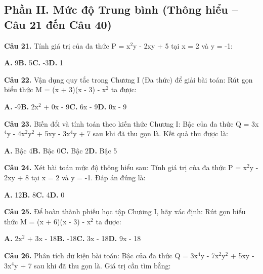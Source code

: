 \documentclass[11pt,a4paper]{article}
\begin{document}
\subsection*{\color{accent} Phần II. Mức độ Trung bình (Thông hiểu -- Câu 21 đến Câu 40)}
\textbf{\color{primary} Câu 21.} Tính giá trị của đa thức P = x$^2$y - 2xy + 5 tại x = 2 và y = -1:\par
\hspace*{1.5em}\textbf{A.} 9\quad\quad \textbf{B.} 5\quad\quad \textbf{C.} -3\quad\quad \textbf{D.} 1\par\vspace{2pt}
\textbf{\color{primary} Câu 22.} Vận dụng quy tắc trong Chương I (Đa thức) để giải bài toán: Rút gọn biểu thức M = (x + 3)(x - 3) - x$^2$ ta được:\par
\hspace*{1.5em}\textbf{A.} -9\quad\quad \textbf{B.} 2x$^2$ + 0x - 9\quad\quad \textbf{C.} 6x - 9\quad\quad \textbf{D.} 0x - 9\par\vspace{2pt}
\textbf{\color{primary} Câu 23.} Biến đổi và tính toán theo kiến thức Chương I: Bậc của đa thức Q = 3x$^4$y - 4x$^2$y$^2$ + 5xy - 3x$^4$y + 7 sau khi đã thu gọn là. Kết quả thu được là:\par
\hspace*{1.5em}\textbf{A.} Bậc 4\quad\quad \textbf{B.} Bậc 0\quad\quad \textbf{C.} Bậc 2\quad\quad \textbf{D.} Bậc 5\par\vspace{2pt}
\textbf{\color{primary} Câu 24.} Xét bài toán mức độ thông hiểu sau: Tính giá trị của đa thức P = x$^2$y - 2xy + 8 tại x = 2 và y = -1. Đáp án đúng là:\par
\hspace*{1.5em}\textbf{A.} 12\quad\quad \textbf{B.} 8\quad\quad \textbf{C.} 4\quad\quad \textbf{D.} 0\par\vspace{2pt}
\textbf{\color{primary} Câu 25.} Để hoàn thành phiếu học tập Chương I, hãy xác định: Rút gọn biểu thức M = (x + 6)(x - 3) - x$^2$ ta được:\par
\hspace*{1.5em}\textbf{A.} 2x$^2$ + 3x - 18\quad\quad \textbf{B.} -18\quad\quad \textbf{C.} 3x - 18\quad\quad \textbf{D.} 9x - 18\par\vspace{2pt}
\textbf{\color{primary} Câu 26.} Phân tích dữ kiện bài toán: Bậc của đa thức Q = 3x$^4$y - 7x$^2$y$^2$ + 5xy - 3x$^4$y + 7 sau khi đã thu gọn là. Giá trị cần tìm bằng:\par
\end{document}
